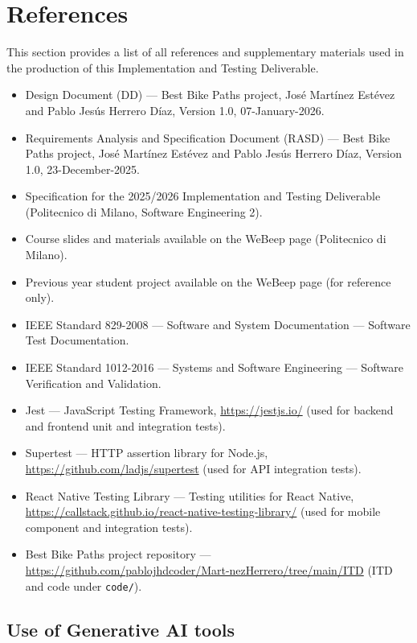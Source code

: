 \section{References}
\label{sec:references}%

This section provides a list of all references and supplementary materials used in the production of this Implementation and Testing Deliverable.

\begin{itemize}
    \item Design Document (DD) --- Best Bike Paths project, José Martínez Estévez and Pablo Jesús Herrero Díaz, Version 1.0, 07-January-2026.
    \item Requirements Analysis and Specification Document (RASD) --- Best Bike Paths project, José Martínez Estévez and Pablo Jesús Herrero Díaz, Version 1.0, 23-December-2025.
    \item Specification for the 2025/2026 Implementation and Testing Deliverable (Politecnico di Milano, Software Engineering 2).
    \item Course slides and materials available on the WeBeep page (Politecnico di Milano).
    \item Previous year student project available on the WeBeep page (for reference only).
    \item IEEE Standard 829-2008 --- Software and System Documentation --- Software Test Documentation.
    \item IEEE Standard 1012-2016 --- Systems and Software Engineering --- Software Verification and Validation.
    \item Jest --- JavaScript Testing Framework, \url{https://jestjs.io/} (used for backend and frontend unit and integration tests).
    \item Supertest --- HTTP assertion library for Node.js, \url{https://github.com/ladjs/supertest} (used for API integration tests).
    \item React Native Testing Library --- Testing utilities for React Native, \url{https://callstack.github.io/react-native-testing-library/} (used for mobile component and integration tests).
    \item Best Bike Paths project repository --- \url{https://github.com/pablojhdcoder/Mart-nezHerrero/tree/main/ITD} (ITD and code under \texttt{code/}).
\end{itemize}

\subsection{Use of Generative AI tools}

